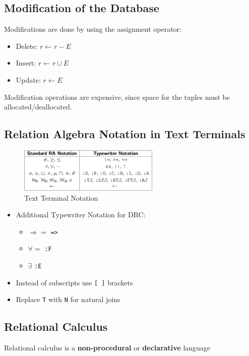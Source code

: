 \subsection{Modification of the Database}
Modifications are done by using the assignment operator:
\begin{itemize}
    \item Delete: $r\leftarrow r - E$
    \item Insert: $r \leftarrow r \cup E$
    \item Update: $r \leftarrow E$
\end{itemize}
Modification operations are expensive, since space for the tuples must be allocated/deallocated.
\subsection{Relation Algebra Notation in Text Terminals}

\begin{figure}[H]
\centering
\includegraphics[width=0.6\textwidth]{images/Screenshot 2024-05-04 at 10.44.01.jpg}
\caption{Text Terminal Notation}
\end{figure}
\begin{itemize}
    \item Additional Typewriter Notation for DRC:
    \begin{itemize}
        \item $\Rightarrow=$ \texttt{=>}
        \item $\forall=$ \texttt{:F}
        \item $\exists$ \texttt{:E}
    \end{itemize}
    \item Instead of subscripts use \texttt{[ ]} brackets
    \item Replace \texttt{T} with \texttt{N} for natural joins
\end{itemize}

\subsection{Relational Calculus}

Relational calculus is a \textbf{non-procedural} or \textbf{declarative} language

